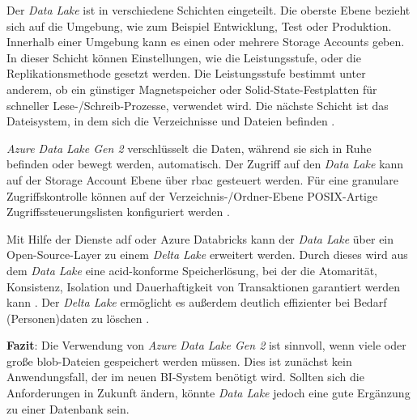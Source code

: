 Der \textit{Data Lake} ist in verschiedene Schichten eingeteilt. Die oberste Ebene bezieht sich auf die Umgebung, wie zum Beispiel Entwicklung, Test oder Produktion. Innerhalb einer Umgebung kann es einen oder mehrere Storage Accounts geben. In dieser Schicht können Einstellungen, wie die Leistungsstufe, oder die Replikationsmethode gesetzt werden. Die Leistungsstufe bestimmt unter anderem, ob ein günstiger Magnetspeicher oder Solid-State-Festplatten für schneller Lese-/Schreib-Prozesse, verwendet wird. Die nächste Schicht ist das Dateisystem, in dem sich die Verzeichnisse und Dateien befinden \cite{lesteve_definitive_2021}.

\textit{Azure Data Lake Gen 2} verschlüsselt die Daten, während sie sich in Ruhe befinden oder bewegt werden, automatisch. Der Zugriff auf den \textit{Data Lake} kann auf der Storage Account Ebene über \ac{rbac} gesteuert werden. Für eine granulare Zugriffskontrolle können auf der Verzeichnis-/Ordner-Ebene POSIX-Artige Zugriffssteuerungslisten konfiguriert werden \cite{lesteve_definitive_2021}.

Mit Hilfe der Dienste \ac{adf} oder Azure Databricks kann der \textit{Data Lake} über ein Open-Source-Layer zu einem \textit{Delta Lake} erweitert werden. Durch dieses wird aus dem \textit{Data Lake} eine \ac{acid}-konforme Speicherlösung, bei der die Atomarität, Konsistenz, Isolation und Dauerhaftigkeit von Transaktionen garantiert werden kann \cite{lesteve_definitive_2021}. Der \textit{Delta Lake} ermöglicht es außerdem deutlich effizienter bei Bedarf (Personen)daten zu löschen \cite{msdoc_21_deltaLake_gdpr}.

\textbf{Fazit}: Die Verwendung von \textit{Azure Data Lake Gen 2} ist sinnvoll, wenn viele oder große \ac{blob}-Dateien gespeichert werden müssen. Dies ist zunächst kein Anwendungsfall, der im neuen BI-System benötigt wird. Sollten sich die Anforderungen in Zukunft ändern, könnte \textit{Data Lake} jedoch eine gute Ergänzung zu einer Datenbank sein.

